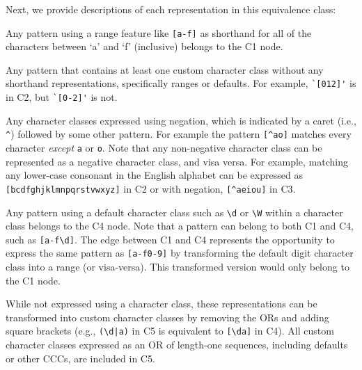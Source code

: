 Next, we provide descriptions of each representation in this equivalence class:
\begin{description}  \itemsep -1pt
\item[C1:] Any pattern using a range feature like \verb![a-f]! as shorthand for all of the characters between `a' and `f' (inclusive) belongs to the C1 node.

\item[C2:] Any pattern that contains at least one  custom character class  without any shorthand representations, specifically ranges or defaults. For example, \verb!`[012]'! is in C2, but \verb!`[0-2]'! is not. 

\item[C3:] Any character classes expressed using negation, which is indicated by a caret (i.e., \verb!^!) followed by some other pattern.  For example the pattern \verb![^ao]! matches every character \emph{except} \verb!a! or \verb!o!.  Note that any non-negative character class can be represented as a negative character class, and visa versa.  For example, matching any lower-case consonant in the English alphabet can be expressed as \verb![bcdfghjklmnpqrstvwxyz]! in C2 or with negation, \verb![^aeiou]! in C3.


\item[C4:] Any pattern using a default character class such as \verb!\d! or \verb!\W! within a character class belongs to the C4 node.  Note that a pattern can belong to both C1 and C4, such as \verb![a-f\d]!.  The edge between C1 and C4 represents the opportunity to express the same pattern as \verb![a-f0-9]! by transforming the default digit character class into a range (or visa-versa).  This transformed version would only belong to the C1 node.

\item[C5:] While not expressed using a character class, these representations can be transformed into custom character classes by removing the ORs and adding square brackets (e.g., \verb!(\d|a)! in C5 is equivalent to \verb![\da]! in C4). All custom character classes expressed as an OR of length-one sequences, including defaults or other CCCs, are included in C5. 
\end{description}

